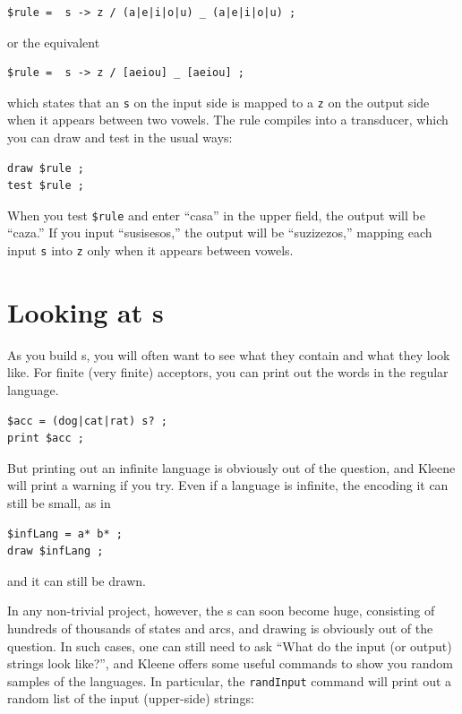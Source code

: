 \begin{Verbatim}
$rule =  s -> z / (a|e|i|o|u) _ (a|e|i|o|u) ;
\end{Verbatim}

\noindent
or the equivalent

\begin{Verbatim}
$rule =  s -> z / [aeiou] _ [aeiou] ;
\end{Verbatim}

\noindent
which states that an \texttt{s} on the input side is mapped to a \texttt{z} on the output
side when it appears between two vowels.  The rule compiles into a transducer, which you can
draw and test in the usual ways:

\begin{Verbatim}
draw $rule ;
test $rule ;
\end{Verbatim}

\noindent
When you test \verb!$rule! and enter ``casa'' in the upper field, the output will be ``caza.''  If you input
``susisesos,'' the output will be ``suzizezos,'' mapping each input \texttt{s} into \texttt{z} only when it
appears between vowels.


\section{Looking at \fsm{}s}

As you build \fsm{}s, you will often want to see what they contain and what they look like. 
For finite (very finite) acceptors, you can print out the words in the regular language.


\begin{Verbatim}
$acc = (dog|cat|rat) s? ;
print $acc ;
\end{Verbatim}

\noindent
But printing out an infinite language is obviously out of the question, and Kleene will print
a warning if you try.  Even if a language
is infinite, the \fsm{} encoding it can still be small, as in

\begin{Verbatim}
$infLang = a* b* ;
draw $infLang ;
\end{Verbatim}

\noindent
and it can still be drawn.

In any non-trivial project, however, the \fsm{}s can soon become huge, consisting of hundreds of
thousands of states and arcs, and drawing is obviously out of the question.  In such cases,
one can still need to ask ``What do the input (or output) strings look like?'', and Kleene
offers some useful commands to show you random samples of the languages.  
In particular, the \texttt{randInput} command will print out
a random list of the input (upper-side) strings:


